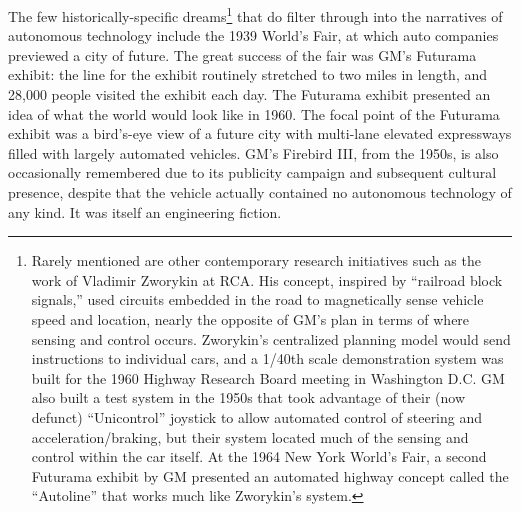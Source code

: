 The few historically-specific 
dreams\footnote{Rarely mentioned are other contemporary research
  initiatives such as the work of Vladimir Zworykin at RCA. His
  concept, inspired by ``railroad block signals,'' used circuits
  embedded in the road to magnetically sense vehicle speed and
  location, nearly the opposite of GM's plan in terms of where sensing
and control occurs.\cite[p. 9]{wetmore} Zworykin's centralized planning model would send
instructions to individual cars, and a 1/40th scale demonstration
system was built for the 1960 Highway Research Board meeting in
Washington D.C. GM also built a test system in the 1950s that took
advantage of their (now defunct) ``Unicontrol'' joystick to allow
automated control of steering and acceleration/braking, but their
system located much of the sensing and control within the car
itself.\cite[p. 8]{wetmore} At the 1964 New York World's Fair, a
second Futurama exhibit by GM presented an automated highway concept
called the ``Autoline'' that works much like Zworykin's
system.\cite[p. 9]{wetmore}} that do filter through into the narratives of autonomous
technology\cite{CBSPetersen} include the 1939 World's Fair, at which auto companies
previewed a city of future. The great success of the fair was GM's
Futurama exhibit: the line for the exhibit routinely stretched to two
miles in length, and 28,000 people visited the exhibit each day. The
Futurama exhibit presented an idea of what the world would look like
in 1960.\cite[p. 371]{nyeElectrifying} The focal point of the Futurama
exhibit was a bird's-eye view of a future city with multi-lane elevated
expressways filled with largely automated vehicles. GM's Firebird III,
from the 1950s, is also occasionally remembered due to its publicity campaign and
subsequent cultural presence,\cite{walshVs} despite that the vehicle actually
contained no autonomous technology of any kind.\cite[p. 7]{wetmore} It was
itself an engineering fiction. 


